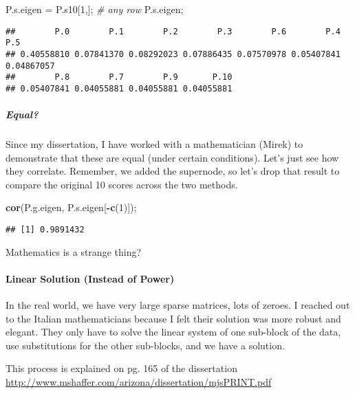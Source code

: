 \documentclass[
]{article}
\newenvironment{Shaded}{\begin{snugshade}}{\end{snugshade}}
\newcommand{\CommentTok}[1]{\textcolor[rgb]{0.56,0.35,0.01}{\textit{#1}}}
\newcommand{\DecValTok}[1]{\textcolor[rgb]{0.00,0.00,0.81}{#1}}
\newcommand{\KeywordTok}[1]{\textcolor[rgb]{0.13,0.29,0.53}{\textbf{#1}}}
\newcommand{\NormalTok}[1]{#1}
\newcommand{\OperatorTok}[1]{\textcolor[rgb]{0.81,0.36,0.00}{\textbf{#1}}}
\newcommand{\StringTok}[1]{\textcolor[rgb]{0.31,0.60,0.02}{#1}}
\begin{document}
\begin{Shaded}
\begin{Highlighting}[]
\NormalTok{P.s.eigen =}\StringTok{ }\NormalTok{P.s10[}\DecValTok{1}\NormalTok{,]; }\CommentTok{\# any row}
\NormalTok{P.s.eigen;}
\end{Highlighting}
\end{Shaded}

\begin{verbatim}
##        P.0        P.1        P.2        P.3        P.6        P.4        P.5 
## 0.40558810 0.07841370 0.08292023 0.07886435 0.07570978 0.05407841 0.04867057 
##        P.8        P.7        P.9       P.10 
## 0.05407841 0.04055881 0.04055881 0.04055881
\end{verbatim}

\hypertarget{equal}{%
\subparagraph{Equal?}\label{equal}}

Since my dissertation, I have worked with a mathematician (Mirek) to
demonstrate that these are equal (under certain conditions). Let's just
see how they correlate. Remember, we added the supernode, so let's drop
that result to compare the original 10 scores across the two methods.

\begin{Shaded}
\begin{Highlighting}[]
\KeywordTok{cor}\NormalTok{(P.g.eigen, P.s.eigen[}\OperatorTok{{-}}\KeywordTok{c}\NormalTok{(}\DecValTok{1}\NormalTok{)]);}
\end{Highlighting}
\end{Shaded}

\begin{verbatim}
## [1] 0.9891432
\end{verbatim}

Mathematics is a strange thing?

\hypertarget{linear-solution-instead-of-power}{%
\paragraph{Linear Solution (Instead of
Power)}\label{linear-solution-instead-of-power}}

In the real world, we have very large sparse matrices, lots of zeroes. I
reached out to the Italian mathematicians because I felt their solution
was more robust and elegant. They only have to solve the linear system
of one sub-block of the data, use substitutions for the other
sub-blocks, and we have a solution.

This process is explained on pg. 165 of the dissertation
\url{http://www.mshaffer.com/arizona/dissertation/mjsPRINT.pdf}
\end{document}
